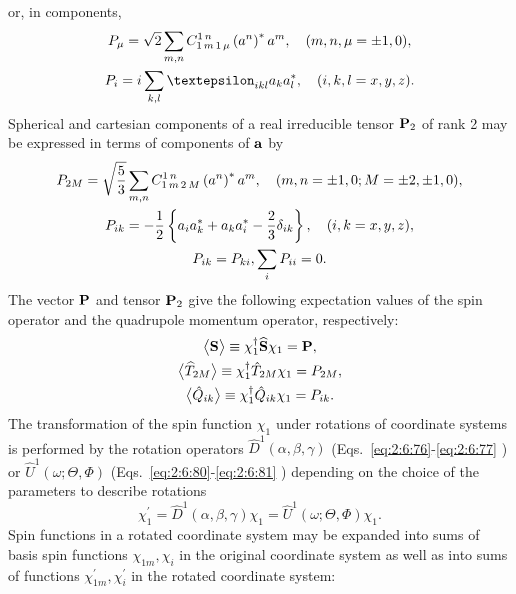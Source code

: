 or, in components,
\begin{gather}
P_{\mu}=\sqrt{2} \sum_{m, n} \clebsch{1}{m}{1}{\mu}{1}{n}\left(a^{n}\right)^{*} a^{m}, \quad(m, n, \mu= \pm 1,0), \notag\\
P_{i}=i \sum_{k, l} \varepsilon_{i k l} a_{k} a_{l}^{*}, \quad(i, k, l=x, y, z) . \label{eq:6:3:74}
\end{gather}
Spherical and cartesian components of a real irreducible tensor $\mathbf{P}_{2}$ of rank 2 may be expressed in terms of components of $\mathbf{a}$ by
\begin{gather}
P_{2 M}=\sqrt{\frac{5}{3}} \sum_{m, n} C_{1\,m\,2\,M}^{1\,n}\left(a^{n}\right)^{*} a^{m}, \quad(m, n= \pm 1,0 ; M= \pm 2, \pm 1,0), \notag\\
P_{i k}=-\frac{1}{2}\left\{a_{i} a_{k}^{*}+a_{k} a_{i}^{*}-\frac{2}{3} \delta_{i k}\right\}, \quad(i, k=x, y, z), \label{eq:6:3:75}\\
P_{i k}=P_{k i}, \sum_{i} P_{i i}=0 . \notag
\end{gather}
The vector $\mathbf{P}$ and tensor $\mathbf{P}_{2}$ give the following expectation values of the spin operator and the quadrupole momentum operator, respectively:
\begin{gather}
\bigl\langle {\mathbf{S}} \bigr\rangle \equiv \chi_{1}^{\dagger} \widehat{\mathbf{S}} \chi_{1}=\mathbf{P}, \notag\\
\bigl\langle {\widehat{T}_{2 M}} \bigr\rangle \equiv \chi_{1}^{\dagger} \hat{T}_{2 M} \chi_{1}=P_{2 M}, \label{eq:6:3:76}\\
\bigl\langle {\hat{Q}_{i k}} \bigr\rangle \equiv \chi_{1}^{\dagger} \hat{Q}_{i k} \chi_{1}=P_{i k} . \notag
\end{gather}
The transformation of the spin function $\chi_{1}$ under rotations of coordinate systems is performed by the rotation operators $\hat{D}^{1}(\alpha, \beta, \gamma)$ (Eqs.~\eqref{eq:2:6:76}-\eqref{eq:2:6:77} ) or $\hat{U}^{1}(\omega ; \Theta, \Phi)$ (Eqs.~\eqref{eq:2:6:80}-\eqref{eq:2:6:81} ) depending on the choice of the parameters to describe rotations
\begin{equation}
\chi_{1}^{\prime}=\hat{D}^{1}(\alpha, \beta, \gamma) \chi_{1}=\hat{U}^{1}(\omega ; \Theta, \Phi) \chi_{1} . \label{eq:6:3:77}
\end{equation}
Spin functions in a rotated coordinate system may be expanded into sums of basis spin functions $\chi_{1 m}, \chi_{i}$ in the original coordinate system as well as into sums of functions $\chi_{1 m}^{\prime}, \chi_{i}^{\prime}$ in the rotated coordinate system:
